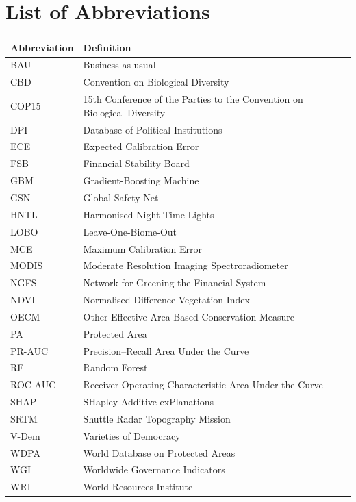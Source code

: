 \documentclass[12pt]{article}
\theoremstyle{break}
\begin{document}
\newpage
{\small\tableofcontents}
\newpage

\section*{List of Abbreviations}
\begin{tabular}{@{}ll@{}}
\toprule
\textbf{Abbreviation} & \textbf{Definition} \\
\midrule
BAU     & Business-as-usual \\
CBD     & Convention on Biological Diversity \\
COP15   & 15th Conference of the Parties to the Convention on Biological Diversity \\
DPI     & Database of Political Institutions \\
ECE     & Expected Calibration Error \\
FSB     & Financial Stability Board \\
GBM     & Gradient-Boosting Machine \\
GSN     & Global Safety Net \\
HNTL    & Harmonised Night-Time Lights \\
LOBO    & Leave-One-Biome-Out \\
MCE     & Maximum Calibration Error \\
MODIS   & Moderate Resolution Imaging Spectroradiometer \\
NGFS    & Network for Greening the Financial System \\
NDVI    & Normalised Difference Vegetation Index \\
OECM    & Other Effective Area-Based Conservation Measure \\
PA      & Protected Area \\
PR-AUC  & Precision--Recall Area Under the Curve \\
RF      & Random Forest \\
ROC-AUC & Receiver Operating Characteristic Area Under the Curve \\
SHAP    & SHapley Additive exPlanations \\
SRTM    & Shuttle Radar Topography Mission \\
V-Dem   & Varieties of Democracy \\
WDPA    & World Database on Protected Areas \\
WGI     & Worldwide Governance Indicators \\
WRI     & World Resources Institute \\
\bottomrule
\end{tabular}
\end{document}
